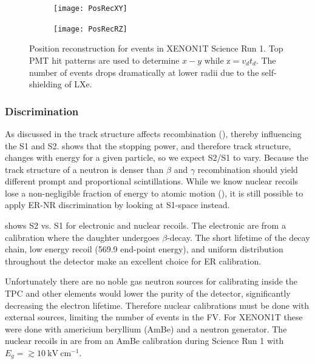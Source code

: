 \begin{figure}
    \centering
    \begin{subfigure}[t]{0.45\textwidth}
        \centering
        \texttt{[image: PosRecXY]}
    \end{subfigure}%
    \begin{subfigure}[t]{0.45\textwidth}
        \centering
        \texttt{[image: PosRecRZ]}
    \end{subfigure}
    \caption{Position reconstruction for events in XENON1T Science Run 1.  Top PMT hit patterns are used to determine $x-y$ while
    $\mathrm{z} = v_{d} t_{d}$.  The number of events drops dramatically at lower radii due to the self-shielding of LXe.}
	\label{fig:tpcs_signals_posrec}
\end{figure}



\subsubsection{Discrimination}
\label{subsubsec:tpcs_signals_discr}
As discussed in  the track structure affects recombination (), thereby
influencing the S1 and S2.   shows that the stopping power, and therefore track structure, changes
with energy for a given particle, so we expect S2/S1 to vary.  Because the track structure of a neutron is denser than $\beta$ and
$\gamma$ recombination should yield different prompt and proportional scintillations.  While we know nuclear recoils lose a
non-negligible fraction of energy to atomic motion
(), it is still possible to apply ER-NR discrimination by looking at S1-space instead.

 shows S2 vs. S1 for electronic and nuclear recoils.  The electronic are from a  calibration
where the  daughter undergoes $\beta$-decay.  The short lifetime of the  decay chain, low energy
recoil (569.9 end-point energy), and uniform distribution throughout the detector make  an excellent choice for
ER calibration.

Unfortunately there are no noble gas neutron sources
for calibrating inside the TPC and other elements would lower the purity of the detector, significantly decreasing the electron
lifetime.  Therefore nuclear calibrations must be done with external sources, limiting the number of events in the FV.  For XENON1T
these were done with americium beryllium (AmBe) and a neutron generator.  The nuclear recoils in  are from
an AmBe calibration during Science Run 1 with $E_g = \gtrsim 10 \ \mathrm{kV\ cm^{-1}}$.

